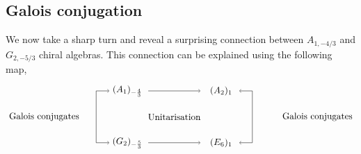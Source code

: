 \documentclass[a4paper,12pt]{article}
\begin{document}
\subsection{Galois conjugation}\label{galois_conjugation_section}

We now take a sharp turn and reveal a surprising connection between $A_{1,-4/3}$ and $G_{2,-5/3}$ chiral algebras. This connection can be explained using the following map,
\begin{equation}\label{figure-gal-uni}
	   \begin{tikzpicture}                             %
		\draw[->] (-1,1) -- (1,1);
		\draw[->] (-1,-1) -- (1,-1);
		\draw[->] (-3,1) -- (-2.5,1);
		\draw[->] (3,-1) -- (2.5,-1);
		\draw[->] (3,1) -- (2.5,1);
		\draw[->] (-3,-1) -- (-2.5,-1);
		\draw (-3,1) -- (-3,-1);
		\draw (3,1) -- (3,-1);
		\node at (-1.8, 1) {$(A_1)_{-\frac{4}{3}}$};
		\node at (1.8, 1) {$(A_2)_{1}$};
		\node at (-1.8, -1) {$(G_2)_{-\frac{5}{3}}$};
		\node at (1.8, -1) {$(E_6)_{1}$};
	\node at (0,0) {Unitarisation};
	\node at (-5,0) {Galois conjugates};
	\node at (5.5,0) {Galois conjugates};	
	\end{tikzpicture}                    
\end{equation}
 
\end{document}

